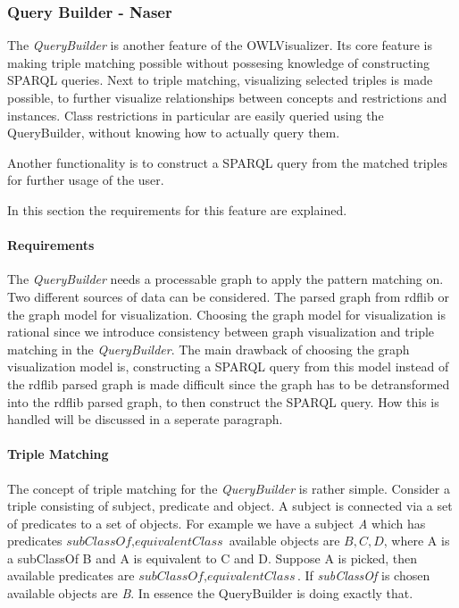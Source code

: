 \subsubsection*{Query Builder - Naser}
The \textit{QueryBuilder} is another feature of the OWLVisualizer. Its core feature is making triple matching possible without possesing knowledge of  
constructing SPARQL queries. Next to triple matching, visualizing selected triples is made possible, to further visualize relationships between concepts and restrictions
and instances. 
Class restrictions in particular are easily queried using the QueryBuilder, without knowing how to actually query them. 

Another functionality is to construct a SPARQL query from the matched triples for further usage of the user. 

In this section the requirements for this feature are explained.

\paragraph*{Requirements}

The \textit{QueryBuilder} needs a processable graph to apply the pattern matching on. 
Two different sources of data can be considered. The parsed graph from rdflib or the graph model for visualization.
Choosing the graph model for visualization is rational since we introduce consistency between graph visualization and
triple matching in the \textit{QueryBuilder}. The main drawback of choosing the graph visualization model is, constructing a
SPARQL query from this model instead of the rdflib parsed graph is made difficult since the graph has to be detransformed into the rdflib parsed graph, to then construct the 
SPARQL query. How this is handled will be discussed in a seperate paragraph. 


\paragraph*{Triple Matching}
The concept of triple matching for the \textit{QueryBuilder} is rather simple.
Consider a triple consisting of subject, predicate and object.
A subject is connected via a set of predicates to a set of objects. 
For example we have a subject \textit{A} which has predicates ${\textit{subClassOf}, \textit{equivalentClass}}$
available objects are ${\textit{B}, \textit{C}, \textit{D}}$, where A is a subClassOf B and A is equivalent to C and D. 
Suppose A is picked, then available predicates are ${\textit{subClassOf}, \textit{equivalentClass}}$.
If \textit{subClassOf} is chosen available objects are \textit{B}.
In essence the QueryBuilder is doing exactly that.



